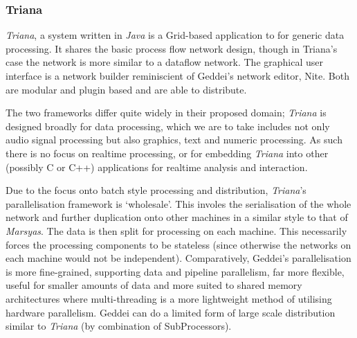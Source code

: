 \subsubsection{Triana}

\textit{Triana}, a system written in \textit{Java} is a Grid-based application to for generic data processing. It shares the basic process flow network design, though in Triana's case the network is more similar to a dataflow network. The graphical user interface is a network builder reminiscient of Geddei's network editor, Nite. Both are modular and plugin based and are able to distribute.

The two frameworks differ quite widely in their proposed domain; \textit{Triana} is designed broadly for data processing, which we are to take includes not only audio signal processing but also graphics, text and numeric processing. As such there is no focus on realtime processing, or for embedding \textit{Triana} into other (possibly C or C++) applications for realtime analysis and interaction.

Due to the focus onto batch style processing and distribution, \textit{Triana}'s parallelisation framework is `wholesale'. This involes the serialisation of the whole network and further duplication onto other machines in a similar style to that of \textit{Marsyas}. The data is then split for processing on each machine. This necessarily forces the processing components to be stateless (since otherwise the networks on each machine would not be independent). Comparatively, Geddei's parallelisation is more fine-grained, supporting data and pipeline parallelism, far more flexible, useful for smaller amounts of data and more suited to shared memory architectures where multi-threading is a more lightweight method of utilising hardware parallelism. Geddei can do a limited form of large scale distribution similar to \textit{Triana} (by combination of SubProcessors).

